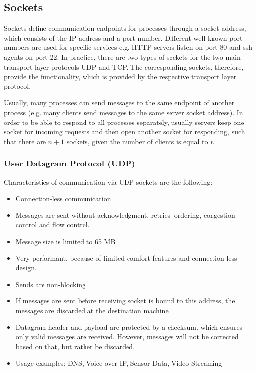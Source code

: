\subsection{Sockets}

Sockets define communication endpoints for processes through a socket address, which consists of the IP address and a port number. Different well-known port numbers are used for specific services e.g. HTTP servers listen on port 80 and ssh agents on port 22. In practice, there are two types of sockets for the two main transport layer protocols \textendash{} \ac{UDP} and \ac{TCP}. The corresponding sockets, therefore, provide the functionality, which is provided by the respective transport layer protocol.

Usually, many processes can send messages to the same endpoint of another process (e.g. many clients send messages to the same server socket address). In order to be able to respond to all processes separately, usually servers keep one socket for incoming requests and then open another socket for responding, such that there are $n+1$ sockets, given the number of clients is equal to $n$.




\subsubsection{User Datagram Protocol (UDP)}

Characteristics of communication via UDP sockets are the following:

\begin{itemize}
    \item Connection-less communication
    \item Messages are sent without acknowledgment, retries, ordering, congestion control and flow control.
    \item Message size is limited to 65 MB
    \item Very performant, because of limited comfort features and connection-less design.
    \item Sends are non-blocking
    \item If messages are sent before receiving socket is bound to this address, the messages are discarded at the destination machine
    \item Datagram header and payload are protected by a checksum, which ensures only valid messages are received. However, messages will not be corrected based on that, but rather be discarded.
    \item Usage examples: DNS, Voice over IP, Sensor Data, Video Streaming
\end{itemize}

